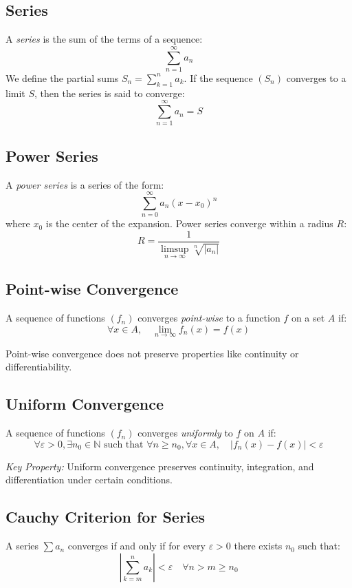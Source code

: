 \subsection{Series}

A \emph{series} is the sum of the terms of a sequence:
\[
\sum_{n=1}^{\infty} a_n
\]
We define the partial sums \(S_n = \sum_{k=1}^n a_k\). If the sequence \((S_n)\) converges to a limit \(S\), then the series is said to converge:
\[
\sum_{n=1}^{\infty} a_n = S
\]

\subsection{Power Series}

A \emph{power series} is a series of the form:
\[
\sum_{n=0}^{\infty} a_n {(x - x_0)}^n
\]
where \(x_0\) is the center of the expansion. Power series converge within a radius \(R\):
\[
R = \frac{1}{\limsup\limits_{n \to \infty} \sqrt[n]{|a_n|}}
\]

\subsection{Point-wise Convergence}

A sequence of functions \((f_n)\) converges \emph{point-wise} to a function \(f\) on a set \(A\) if:
\[
\forall x \in A, \quad \lim_{n \to \infty} f_n(x) = f(x)
\]

Point-wise convergence does not preserve properties like continuity or differentiability.

\subsection{Uniform Convergence}

A sequence of functions \((f_n)\) converges \emph{uniformly} to \(f\) on \(A\) if:
\[
\forall \varepsilon > 0, \exists n_0 \in \mathbb{N} \text{ such that } \forall n \ge n_0, \forall x \in A, \quad |f_n(x) - f(x)| < \varepsilon
\]

\emph{Key Property:} Uniform convergence preserves continuity, integration, and differentiation under certain conditions.

\subsection{Cauchy Criterion for Series}

A series \(\sum a_n\) converges if and only if for every \(\varepsilon > 0\) there exists \(n_0\) such that:
\[
\left| \sum_{k = m}^{n} a_k \right| < \varepsilon \quad \forall n > m \ge n_0
\]

